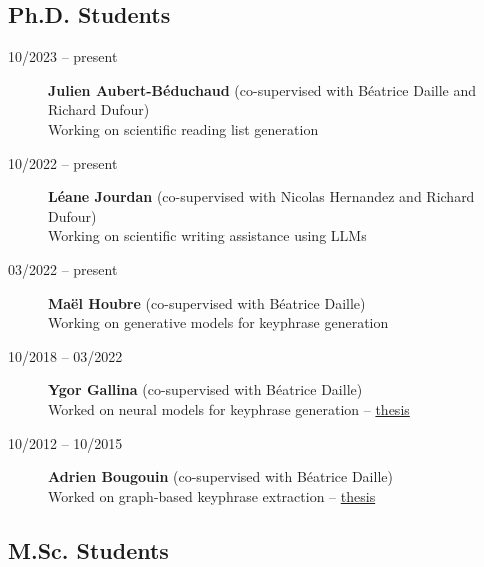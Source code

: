 \subsection*{Ph.D. Students}

\begin{description}

    \item[10/2023 -- present] \textbf{Julien Aubert-Béduchaud}
                               (co-supervised with Béatrice Daille and Richard Dufour) \\
                               Working on scientific reading list generation

    \item[10/2022 -- present] \textbf{Léane Jourdan}
                               (co-supervised with Nicolas Hernandez and Richard Dufour) \\
                               Working on scientific writing assistance using LLMs

    \item[03/2022 -- present] \textbf{Maël Houbre}
                               (co-supervised with Béatrice Daille) \\
                               Working on generative models for keyphrase generation

    \item[10/2018 -- 03/2022] \textbf{Ygor Gallina}
                               (co-supervised with Béatrice Daille) \\
                               Worked on neural models for keyphrase generation -- \href{https://theses.fr/2022NANU4007}{thesis \faFilePdfO}

    \item[10/2012 -- 10/2015] \textbf{Adrien Bougouin}
                               (co-supervised with Béatrice Daille) \\
                               Worked on graph-based keyphrase extraction -- \href{https://theses.fr/2015NANT2047}{thesis \faFilePdfO}

\end{description}

\subsection*{M.Sc. Students}

